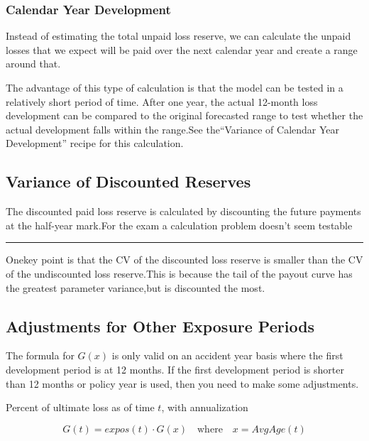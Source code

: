 \documentclass[
]{article}
\begin{document}
\subsubsection{Calendar Year
Development}\label{calendar-year-development}

Instead of estimating the total unpaid loss reserve, we can calculate
the unpaid losses that we expect will be paid over the next calendar
year and create a range around that.

The advantage of this type of calculation is that the model can be
tested in a relatively short period of time. After one year, the actual
12-month loss development can be compared to the original forecasted
range to test whether the actual development falls within the range.See
the``Variance of Calendar Year Development'' recipe for this
calculation.

\subsection{Variance of Discounted
Reserves}\label{variance-of-discounted-reserves}

The discounted paid loss reserve is calculated by discounting the future
payments at the half-year mark.For the exam a calculation problem
doesn't seem testable

\begin{center}\rule{0.5\linewidth}{0.5pt}\end{center}

Onekey point is that the CV of the discounted loss reserve is smaller
than the CV of the undiscounted loss reserve.This is because the tail of
the payout curve has the greatest parameter variance,but is discounted
the most.

\subsection{Adjustments for Other Exposure
Periods}\label{adjustments-for-other-exposure-periods}

The formula for \(G(x)\) is only valid on an accident year basis where
the first development period is at 12 months. If the first development
period is shorter than 12 months or policy year is used, then you need
to make some adjustments.

Percent of ultimate loss as of time \(t\), with annualization

\[G(t)=expos(t)\cdot G(x)\quad\mathrm{where}\quad x=AvgAge(t)\]
\end{document}
